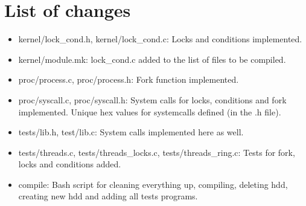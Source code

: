 \documentclass[11pt,a4paper]{article}
\begin{document}
\section{List of changes}

\begin{itemize}
\item kernel/lock\_cond.h, kernel/lock\_cond.c: Locks and conditions implemented.
\item kernel/module.mk: lock\_cond.c added to the list of files to be compiled.
\item proc/process.c, proc/process.h: Fork function implemented.
\item proc/syscall.c, proc/syscall.h: System calls for locks, conditions and fork implemented. Unique hex values for systemcalls defined (in the .h file).
\item tests/lib.h, test/lib.c: System calls implemented here as well.
\item tests/threads.c, tests/threads\_locks.c, tests/threads\_ring.c: Tests for fork, locks and conditions added.
\item compile: Bash script for cleaning everything up, compiling, deleting hdd, creating new hdd and adding all tests programs.

\end{itemize}
\end{document}
